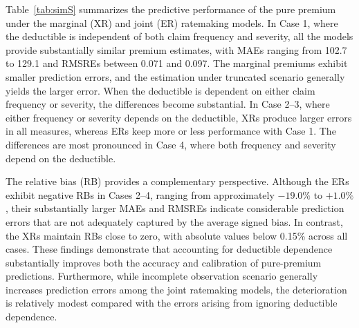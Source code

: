 \documentclass[11pt]{article}
\begin{document}
{\begin{table}[h!]
\caption{MAE, RMSRE and RB of the estimated pure premium}
\label{tab:simS}
\end{table}

Table~\ref{tab:simS} summarizes the predictive performance of the pure premium under the marginal (XR) and joint (ER) ratemaking models. In Case 1, where the deductible is independent of both claim frequency and severity, all the models provide substantially similar premium estimates, with MAEs ranging from 102.7 to 129.1 and RMSREs between 0.071 and 0.097. The marginal premiums exhibit smaller prediction errors, and the estimation under truncated scenario generally yields the larger error. When the deductible is dependent on either claim frequency or severity, the differences become substantial. In Case 2--3, where either frequency or severity depends on the deductible, XRs produce larger errors in all measures, whereas ERs keep more or less performance with Case 1. The differences are most pronounced in Case 4, where both frequency and severity depend on the deductible.

The relative bias (RB) provides a complementary perspective. Although the ERs exhibit negative RBs in Cases 2--4, ranging from approximately $-19.0\%$ to $+1.0\%$, their substantially larger MAEs and RMSREs indicate considerable prediction errors that are not adequately captured by the average signed bias. In contrast, the XRs maintain RBs close to zero, with absolute values below 0.15\% across all cases. These findings demonstrate that accounting for deductible dependence substantially improves both the accuracy and calibration of pure-premium predictions. Furthermore, while incomplete observation scenario generally increases prediction errors among the joint ratemaking models, the deterioration is relatively modest compared with the errors arising from ignoring deductible dependence.

}
\end{document}
